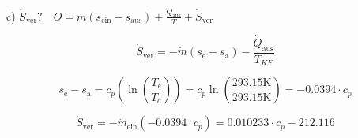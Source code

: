 c) $\dot{S}_{\text{ver}}? \quad O = \dot{m} (s_{\text{ein}} - s_{\text{aus}}) + \frac{\dot{Q}_{\text{aus}}}{T} + \dot{S}_{\text{ver}}$

\[
\dot{S}_{\text{ver}} = -\dot{m} (s_{\text{e}} - s_{\text{a}}) - \frac{\dot{Q}_{\text{aus}}}{T_{KF}}
\]

\[
s_{\text{e}} - s_{\text{a}} = c_p \left( \ln \left( \frac{T_e}{T_a} \right) \right) = c_p \ln \left( \frac{293.15 \text{K}}{293.15 \text{K}} \right) = -0.0394 \cdot c_p
\]

\[
\dot{S}_{\text{ver}} = -\dot{m}_{\text{ein}} (-0.0394 \cdot c_p) = 0.010233 \cdot c_p - 212.116
\]